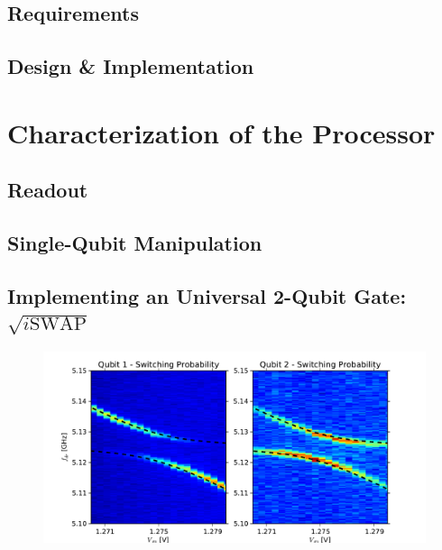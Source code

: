 \subsection{Requirements}


\subsection{Design \& Implementation}


\section{Characterization of the Processor}


\subsection{Readout}


\subsection{Single-Qubit Manipulation}


\subsection{Implementing an Universal 2-Qubit Gate: $\sqrt{i\mathrm{SWAP}}$}

\begin{figure}
	\centering
		\includegraphics[width=1.\textwidth]{./material/figures/2-qubit-processor/characterization/anticrossing/anticrossing}
	\label{fig:QubitAnticrossing}
	\caption{}
\end{figure}


